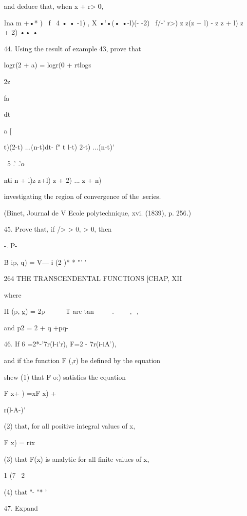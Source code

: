 and deduce that, when x + r> 0, 

  Ina m  +•* ) \  f \  4    • • -1) , X •'•(• •-l)(- -2) \  
f/-'   r>) z   z(z + l) -  z z + l) z + 2) •• • 

44. Using the result of example 43, prove that 



logr(2 + a) = logr(0 + rtlogs 



2z 

fa 

dt 



a [\ \ { t)(2-t) ...(n-t)dt- f" t l-t) 2-t) ...(n-t)' 

\  5 .' .'o 

nti  n + l)z z+l) z + 2) ... z + n) 

investigating the region of convergence of the .series. 

(Binet, Journal de V Ecole polytechnique, xvi. (1839), p. 256.) 



45. Prove that, if /> > 0,   > 0, then 

-. P- 



B ip, q) =   V— i (2 )*   * "' ' 



264 THE TRANSCENDENTAL FUNCTIONS [CHAP, XII 

where 

II (p, g) = 2p — — T arc tan  -  — -. —  - , -, 

and p2 = 2 + q  +pq- 

46. If 6 =2*-'7r(l-i'r), F=2 - 7r(i-iA'), 

and if the function F (,r) be defined by the equation 

shew (1) that F o:) satisfies the equation 

F x+ ) =xF x) +    



r(l-A-)' 

(2) that, for all positive integral values of x, 

F x) = rix\ 

(3) that F(x) is analytic for all finite values of x, 



1 (7 \ 2 

(4) that "-   "* '   



47. Expand 



}
